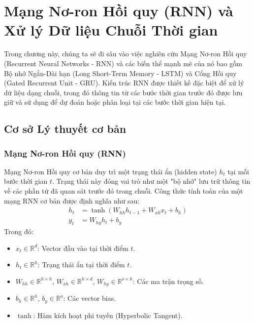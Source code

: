 \section{Mạng Nơ-ron Hồi quy (RNN) và Xử lý Dữ liệu Chuỗi Thời gian}

Trong chương này, chúng ta sẽ đi sâu vào việc nghiên cứu Mạng Nơ-ron Hồi quy (Recurrent Neural Networks - RNN) và các biến thể mạnh mẽ của nó bao gồm Bộ nhớ Ngắn-Dài hạn (Long Short-Term Memory - LSTM) và Cổng Hồi quy (Gated Recurrent Unit - GRU). Kiến trúc RNN được thiết kế đặc biệt để xử lý dữ liệu dạng chuỗi, trong đó thông tin từ các bước thời gian trước đó được lưu giữ và sử dụng để dự đoán hoặc phân loại tại các bước thời gian hiện tại.

\subsection{Cơ sở Lý thuyết cơ bản}

\subsubsection{Mạng Nơ-ron Hồi quy (RNN)}
Mạng Nơ-ron Hồi quy cơ bản duy trì một trạng thái ẩn (hidden state) $h_t$ tại mỗi bước thời gian $t$. Trạng thái này đóng vai trò như một "bộ nhớ" lưu trữ thông tin về các phần tử đã quan sát trước đó trong chuỗi.
Công thức tính toán của một mạng RNN cơ bản được định nghĩa như sau:
\begin{align}
    h_t &= \tanh(W_{hh} h_{t-1} + W_{xh} x_t + b_h) \\
    y_t &= W_{hy} h_t + b_y
\end{align}
Trong đó:
\begin{itemize}
    \item $x_t \in \mathbb{R}^d$: Vector đầu vào tại thời điểm $t$.
    \item $h_t \in \mathbb{R}^h$: Trạng thái ẩn tại thời điểm $t$.
    \item $W_{hh} \in \mathbb{R}^{h \times h}$, $W_{xh} \in \mathbb{R}^{h \times d}$, $W_{hy} \in \mathbb{R}^{o \times h}$: Các ma trận trọng số.
    \item $b_h \in \mathbb{R}^h$, $b_y \in \mathbb{R}^o$: Các vector bias.
    \item $\tanh$: Hàm kích hoạt phi tuyến (Hyperbolic Tangent).
\end{itemize}

